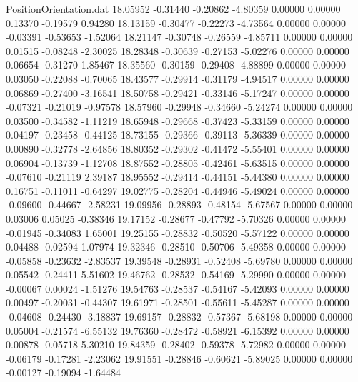 \begin{filecontents}{PositionOrientation.dat}
  18.05952   -0.31440   -0.20862    -4.80359    0.00000    0.00000    0.13370   -0.19579    0.94280
  18.13159   -0.30477   -0.22273    -4.73564    0.00000    0.00000   -0.03391   -0.53653   -1.52064
  18.21147   -0.30748   -0.26559    -4.85711    0.00000    0.00000    0.01515   -0.08248   -2.30025
  18.28348   -0.30639   -0.27153    -5.02276    0.00000    0.00000    0.06654   -0.31270    1.85467
  18.35560   -0.30159   -0.29408    -4.88899    0.00000    0.00000    0.03050   -0.22088   -0.70065
  18.43577   -0.29914   -0.31179    -4.94517    0.00000    0.00000    0.06869   -0.27400   -3.16541
  18.50758   -0.29421   -0.33146    -5.17247    0.00000    0.00000   -0.07321   -0.21019   -0.97578
  18.57960   -0.29948   -0.34660    -5.24274    0.00000    0.00000    0.03500   -0.34582   -1.11219
  18.65948   -0.29668   -0.37423    -5.33159    0.00000    0.00000    0.04197   -0.23458   -0.44125
  18.73155   -0.29366   -0.39113    -5.36339    0.00000    0.00000    0.00890   -0.32778   -2.64856
  18.80352   -0.29302   -0.41472    -5.55401    0.00000    0.00000    0.06904   -0.13739   -1.12708
  18.87552   -0.28805   -0.42461    -5.63515    0.00000    0.00000   -0.07610   -0.21119    2.39187
  18.95552   -0.29414   -0.44151    -5.44380    0.00000    0.00000    0.16751   -0.11011   -0.64297
  19.02775   -0.28204   -0.44946    -5.49024    0.00000    0.00000   -0.09600   -0.44667   -2.58231
  19.09956   -0.28893   -0.48154    -5.67567    0.00000    0.00000    0.03006    0.05025   -0.38346
  19.17152   -0.28677   -0.47792    -5.70326    0.00000    0.00000   -0.01945   -0.34083    1.65001
  19.25155   -0.28832   -0.50520    -5.57122    0.00000    0.00000    0.04488   -0.02594    1.07974
  19.32346   -0.28510   -0.50706    -5.49358    0.00000    0.00000   -0.05858   -0.23632   -2.83537
  19.39548   -0.28931   -0.52408    -5.69780    0.00000    0.00000    0.05542   -0.24411    5.51602
  19.46762   -0.28532   -0.54169    -5.29990    0.00000    0.00000   -0.00067    0.00024   -1.51276
  19.54763   -0.28537   -0.54167    -5.42093    0.00000    0.00000    0.00497   -0.20031   -0.44307
  19.61971   -0.28501   -0.55611    -5.45287    0.00000    0.00000   -0.04608   -0.24430   -3.18837
  19.69157   -0.28832   -0.57367    -5.68198    0.00000    0.00000    0.05004   -0.21574   -6.55132
  19.76360   -0.28472   -0.58921    -6.15392    0.00000    0.00000    0.00878   -0.05718    5.30210
  19.84359   -0.28402   -0.59378    -5.72982    0.00000    0.00000   -0.06179   -0.17281   -2.23062
  19.91551   -0.28846   -0.60621    -5.89025    0.00000    0.00000   -0.00127   -0.19094   -1.64484

\end{filecontents}
